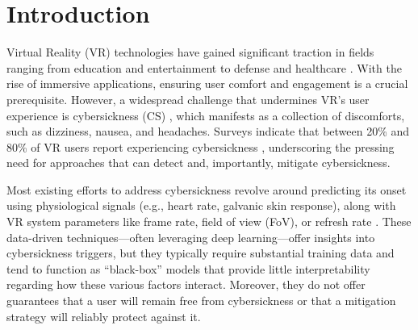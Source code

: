 \documentclass{vgtc}                          %
\begin{document}
\section{Introduction}
Virtual Reality (VR) technologies have gained significant traction in fields ranging from education and entertainment to defense and healthcare \cite{javaid2020virtual, wedel2020virtual}. With the rise of immersive applications, ensuring user comfort and engagement is a crucial prerequisite. However, a widespread challenge that undermines VR’s user experience is cybersickness (CS) 
\cite{Tian2022, 10.1145/333329.333344,szpak2019beyond,stanney2020identifying}
, which manifests as a collection of discomforts, such as dizziness, nausea, and headaches. Surveys indicate that between 20\% and 80\% of VR users report experiencing cybersickness \cite{kim2021clinical}, underscoring the pressing need for approaches that can detect and, importantly, mitigate cybersickness.

Most existing efforts to address cybersickness revolve around predicting its onset using physiological signals (e.g., heart rate, galvanic skin response), along with VR system parameters like frame rate, field of view (FoV), or refresh rate \cite{996519Lin, Zhang9236907, PALMISANO20171, Wang10049694, Campos2021, 9419155Groth}. These data-driven techniques—often leveraging deep learning—offer insights into cybersickness triggers, but they typically require substantial training data and tend to function as “black-box” models that provide little interpretability regarding how these various factors interact. Moreover, they do not offer guarantees that a user will remain free from cybersickness or that a mitigation strategy will reliably protect against it. %
\end{document}
